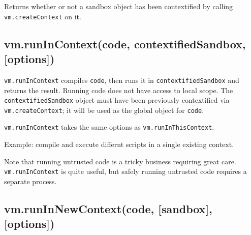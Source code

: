 Returns whether or not a sandbox object has been contextified by calling
\texttt{vm.createContext} on it.

\subsection{vm.runInContext(code, contextifiedSandbox, {[}options{]})}

\texttt{vm.runInContext} compiles \texttt{code}, then runs it in
\texttt{contextifiedSandbox} and returns the result. Running code does
not have access to local scope. The \texttt{contextifiedSandbox} object
must have been previously contextified via \texttt{vm.createContext}; it
will be used as the global object for \texttt{code}.

\texttt{vm.runInContext} takes the same options as
\texttt{vm.runInThisContext}.

Example: compile and execute differnt scripts in a single existing
context.

\begin{Shaded}
\begin{Highlighting}[]
 \NormalTok{);}
 \NormalTok{);}

 \NormalTok{: } \NormalTok{\};}

 \NormalTok{(} 
    \NormalTok{(}
\NormalTok{\}}
\NormalTok{(}

\end{Highlighting}
\end{Shaded}

Note that running untrusted code is a tricky business requiring great
care. \texttt{vm.runInContext} is quite useful, but safely running
untrusted code requires a separate process.

\subsection{vm.runInNewContext(code, {[}sandbox{]}, {[}options{]})}

